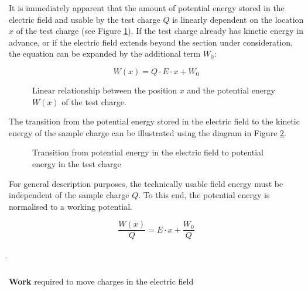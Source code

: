 \begin{frame}
{It is immediately apparent that the amount of potential energy stored in the electric field
and usable by the test charge
$Q$ is linearly dependent on the location $x$ of the test charge (see Figure \ref{fig:zusammenhangEA}). If the test charge
already has kinetic energy in advance, or if the electric field extends beyond the section under consideration,
the equation can be expanded by the additional term $W_0$:


 \begin{equation}
	W(x) = Q \cdot E \cdot x + W_0
 \end{equation}



 \begin{figure}[h!]
	\renewcommand{\figurename}{Figure}
	\centering
	
	\caption{Linear relationship between the position $x$ and the potential energy $W(x)$ of the test charge.}
	\label{fig:zusammenhangEA}
\end{figure}


 

The transition from the potential energy stored in the electric field to the kinetic energy
of the sample charge can be illustrated using the diagram in Figure \ref{fig:ubergang}.

\begin{figure}[h!]
	\renewcommand{\figurename}{Figure}
	\centering
	
	\caption{Transition from potential energy in the electric field to potential energy in the test charge}
	\label{fig:ubergang}
\end{figure}




 For general description purposes, the technically usable field energy must be independent of the sample charge $Q$.
 To this end, the potential energy is normalised to a working potential.

 \begin{equation*}
	\frac{W(x)}{Q} =  E \cdot x + \frac{W_0}{Q}
 \end{equation*}

 

	}

	\b{
	\begin{columns}

		


		\textbf{Work} required to move charges in the electric field \\


\end{columns}}
\end{frame}
